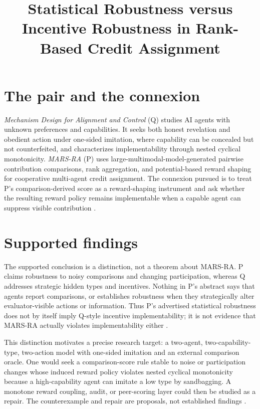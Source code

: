 \documentclass{article}
\title{Statistical Robustness versus Incentive Robustness in Rank-Based Credit Assignment}
\begin{document}
\maketitle

\section{The pair and the connexion}

\emph{Mechanism Design for Alignment and Control} (Q) studies AI agents with unknown preferences and capabilities.  It seeks both honest revelation and obedient action under one-sided imitation, where capability can be concealed but not counterfeited, and characterizes implementability through nested cyclical monotonicity.  \emph{MARS-RA} (P) uses large-multimodal-model-generated pairwise contribution comparisons, rank aggregation, and potential-based reward shaping for cooperative multi-agent credit assignment.  The connexion pursued is to treat P's comparison-derived score as a reward-shaping instrument and ask whether the resulting reward policy remains implementable when a capable agent can suppress visible contribution .

\section{Supported findings}

The supported conclusion is a distinction, not a theorem about MARS-RA.  P claims robustness to noisy comparisons and changing participation, whereas Q addresses strategic hidden types and incentives.  Nothing in P's abstract says that agents report comparisons, or establishes robustness when they strategically alter evaluator-visible actions or information.  Thus P's advertised statistical robustness does not by itself imply Q-style incentive implementability; it is not evidence that MARS-RA actually violates implementability either .

This distinction motivates a precise research target: a two-agent, two-capability-type, two-action model with one-sided imitation and an external comparison oracle.  One would seek a comparison-score rule stable to noise or participation changes whose induced reward policy violates nested cyclical monotonicity because a high-capability agent can imitate a low type by sandbagging.  A monotone reward coupling, audit, or peer-scoring layer could then be studied as a repair.  The counterexample and repair are proposals, not established findings .
\end{document}
